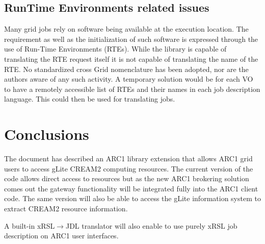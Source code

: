 \documentclass{article}
\begin{document}
\subsection{RunTime Environments related issues}
Many grid jobs rely on software being available at the execution location. The requirement as well as the initialization 
of such software is expressed through the use of Run-Time Environments (RTEs). While the library is capable of 
translating the RTE request itself it is not capable of translating the name of the RTE. No standardized cross Grid 
nomenclature has been adopted, nor are the authors aware of any such activity. A temporary solution would be for each 
VO to have a remotely accessible list of RTEs and their names in each job description language. This could then be used for translating jobs.
\section{Conclusions}
\label{Conclusions}
The document has described an ARC1 library extension that allows ARC1 grid users to access gLite CREAM2 computing resources. The current version of the code allows direct access to resources but as the new ARC1 brokering solution comes out the gateway functionality will be integrated fully into the ARC1 client code. The same version will also be able to access the gLite information system to extract CREAM2 resource information.\par
A built-in xRSL${\rightarrow}$JDL translator will also enable to use purely xRSL job description on ARC1 user interfaces.
\appendix
\end{document}
